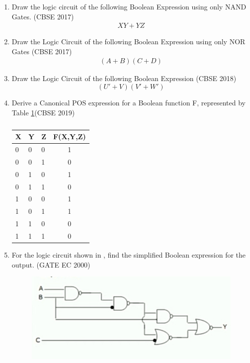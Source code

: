 \begin{enumerate}[label=\arabic*.,ref=\theenumi]
\item Draw the logic circuit of the following Boolean Expression using only NAND Gates.
\hfill (CBSE 2017)
\label{prob:2017-1/c/6/b}
		\begin{align}
\label{eq:2017-1/c/6/b}
 XY + YZ
		\end{align}
\item Draw the Logic Circuit of the following Boolean Expression using only NOR Gates  
\hfill (CBSE 2017)
\label{prob:2017/c/6/b}
      \begin{align}
      (A+B)(C+D)
      \end{align}
\item Draw the Logic Circuit of the following Boolean Expression
\hfill (CBSE 2018)
\label{prob:2018/c/6/b}
\begin{equation} 
(U'+V)(V'+W')
\end{equation}
\item Derive a Canonical POS expression for a Boolean function F, represented by 
Table \ref{tab:2019/c/6/c}\hfill (CBSE 2019)
\label{prob:2019/c/6/c}
\begin{table}[!ht]
\centering
\begin{tabular}{|l|l|l|c|}
	\hline
	X&Y&Z&F(X,Y,Z)\\
	\hline
	0&0&0&1\\
	0&0&1&0\\
	0&1&0&1\\
	0&1&1&0\\
	1&0&0&1\\
	1&0&1&1\\
	1&1&0&0\\
	1&1&1&0\\
	\hline
\end{tabular}
\caption{}
\label{tab:2019/c/6/c}
\end{table}
\item For the logic circuit shown in , find the simplified Boolean expression for the output. 
\label{prob:2000/gate/ec/2/7}
\hfill (GATE EC 2000)
\begin{figure}[!ht]
    \centering
    \includegraphics[width=\columnwidth]{figs/2000-gate-ec-2-7.jpg}

\end{figure}
\end{enumerate}
